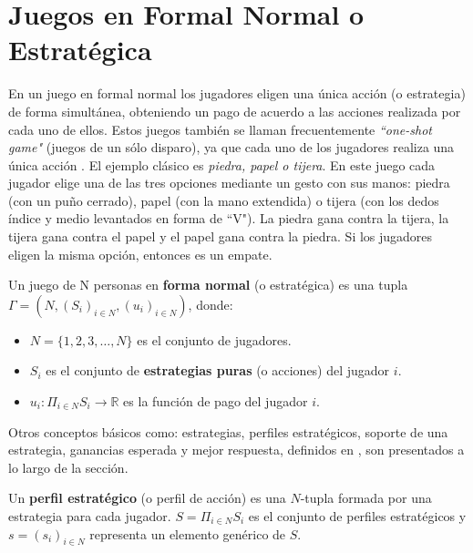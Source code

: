 \section{Juegos en Formal Normal o Estratégica}
\label{section:forma-normal}

En un juego en formal normal los jugadores eligen una única acción (o estrategia) de forma simultánea, obteniendo un pago de acuerdo a las acciones realizada por cada uno de ellos. Estos juegos también se llaman frecuentemente \textit{``one-shot game"}   (juegos de un sólo disparo), ya que cada uno de los jugadores realiza una única acción \cite{bib:introductionCFR}. El ejemplo clásico es \textit{piedra, papel o tijera}. En este juego cada jugador elige una de las tres opciones mediante un gesto con sus manos: piedra (con un puño cerrado), papel (con la mano extendida) o tijera (con los dedos índice y medio levantados en forma de ``V"). La piedra gana contra la tijera, la tijera gana contra el papel y el papel gana contra la piedra. Si los jugadores eligen la misma opción, entonces es un empate.


\begin{definition}
\label{def:forma-normal}
Un juego de N personas en \textbf{forma normal} (o estratégica) es una tupla $\Gamma = (N, (S_i)_{i \in N}, (u_i)_{i \in N})$, donde:
	\begin{itemize}[noitemsep]
		\item $N = \{1, 2, 3, \dots, N\}$ es el conjunto de jugadores.
		\item  $S_i$ es el conjunto de \textbf{estrategias puras} (o acciones) del jugador $i$.
		\item $u_i : \Pi _{i \in N} S_i \rightarrow \mathbb{R}$ es la función de pago del jugador $i$.
	\end{itemize}
\end{definition}

Otros conceptos básicos como: estrategias, perfiles estratégicos, soporte de una estrategia, ganancias esperada y mejor respuesta, definidos en \cite{bib:tutorial-existence-nash}, son presentados a lo largo de la sección.

\begin{definition} Un \textbf{perfil estratégico} (o perfil de acción) es una $N$-tupla formada por una estrategia para cada jugador. $S = \Pi_{i \in N}S_i$ es el conjunto de perfiles estratégicos y $s = (s_i)_{i \in N}$ representa un elemento genérico de $S$.  
\end{definition}

